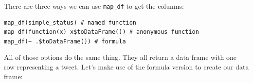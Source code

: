 \documentclass[]{book}
\newenvironment{Shaded}{\begin{snugshade}}{\end{snugshade}}
\newcommand{\KeywordTok}[1]{\textcolor[rgb]{0.13,0.29,0.53}{\textbf{{#1}}}}
\newcommand{\StringTok}[1]{\textcolor[rgb]{0.31,0.60,0.02}{{#1}}}
\newcommand{\NormalTok}[1]{{#1}}
\theoremstyle{definition}
\theoremstyle{definition}
\theoremstyle{remark}
\begin{document}
There are three ways we can use \texttt{map\_df} to get the columns:

\begin{verbatim}
map_df(simple_status) # named function
map_df(function(x) x$toDataFrame()) # anonymous function
map_df(~ .$toDataFrame()) # formula
\end{verbatim}

All of those options do the same thing. They all return a data frame
with one row representing a tweet. Let's make use of the formula version
to create our data frame:

\begin{Shaded}
\end{Shaded}
\end{document}
